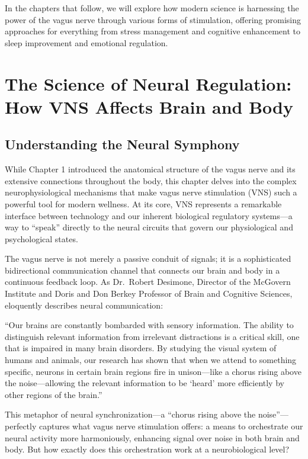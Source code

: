 \documentclass[
  Letterpaper,
]{scrbook}
\begin{document}
In the chapters that follow, we will explore how modern science is
harnessing the power of the vagus nerve through various forms of
stimulation, offering promising approaches for everything from stress
management and cognitive enhancement to sleep improvement and emotional
regulation.


\chapter{The Science of Neural Regulation: How VNS Affects Brain and
Body}\label{the-science-of-neural-regulation-how-vns-affects-brain-and-body}

\section{Understanding the Neural
Symphony}\label{understanding-the-neural-symphony}

While Chapter 1 introduced the anatomical structure of the vagus nerve
and its extensive connections throughout the body, this chapter delves
into the complex neurophysiological mechanisms that make vagus nerve
stimulation (VNS) such a powerful tool for modern wellness. At its core,
VNS represents a remarkable interface between technology and our
inherent biological regulatory systems---a way to ``speak'' directly to
the neural circuits that govern our physiological and psychological
states.

The vagus nerve is not merely a passive conduit of signals; it is a
sophisticated bidirectional communication channel that connects our
brain and body in a continuous feedback loop. As Dr.~Robert Desimone,
Director of the McGovern Institute and Doris and Don Berkey Professor of
Brain and Cognitive Sciences, eloquently describes neural communication:

``Our brains are constantly bombarded with sensory information. The
ability to distinguish relevant information from irrelevant distractions
is a critical skill, one that is impaired in many brain disorders. By
studying the visual system of humans and animals, our research has shown
that when we attend to something specific, neurons in certain brain
regions fire in unison---like a chorus rising above the noise---allowing
the relevant information to be `heard' more efficiently by other regions
of the brain.''

This metaphor of neural synchronization---a ``chorus rising above the
noise''---perfectly captures what vagus nerve stimulation offers: a
means to orchestrate our neural activity more harmoniously, enhancing
signal over noise in both brain and body. But how exactly does this
orchestration work at a neurobiological level?
\end{document}
